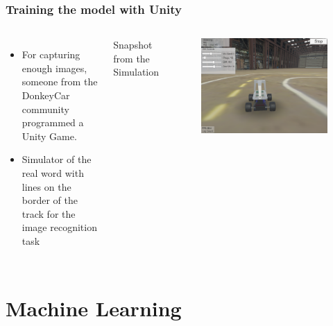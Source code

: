 \documentclass{beamer}
\begin{document}
\begin{frame}
\frametitle{Training the model with Unity}
\begin{columns}[c] %

\begin{itemize}
\item For capturing enough images, someone from the DonkeyCar community programmed a Unity Game.
\item Simulator of the real word with lines on the border of the track for the image recognition task
\end{itemize}

Snapshot from the Simulation
\begin{figure}
\includegraphics[width=0.9\linewidth]{photo/unity}
\end{figure}
\end{columns}
\end{frame}

\section{Machine Learning}
\end{document}
